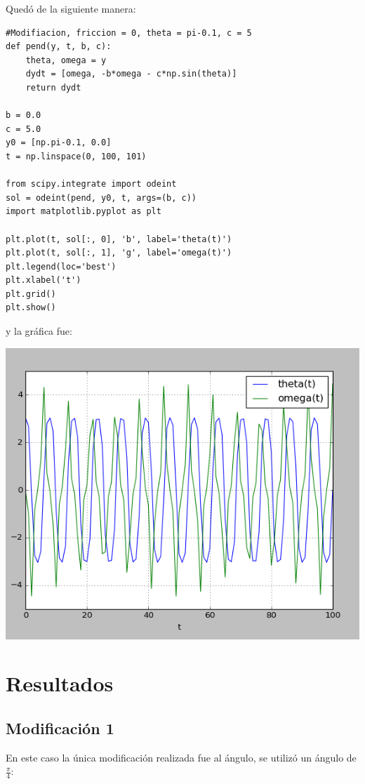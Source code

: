 \documentclass[12pt,letterpaper]{article}
\begin{document}
Quedó de la siguiente manera:

\begin{verbatim}
#Modifiacion, friccion = 0, theta = pi-0.1, c = 5
def pend(y, t, b, c):
    theta, omega = y
    dydt = [omega, -b*omega - c*np.sin(theta)]
    return dydt
    
b = 0.0
c = 5.0
y0 = [np.pi-0.1, 0.0]
t = np.linspace(0, 100, 101)
    
from scipy.integrate import odeint
sol = odeint(pend, y0, t, args=(b, c))
import matplotlib.pyplot as plt
   
plt.plot(t, sol[:, 0], 'b', label='theta(t)')
plt.plot(t, sol[:, 1], 'g', label='omega(t)')
plt.legend(loc='best')
plt.xlabel('t')
plt.grid()
plt.show()

\end{verbatim}
y la gráfica fue: 

\begin{center}
\includegraphics[scale=0.6]{act5codigo1.png}

\end{center}

\section{Resultados}
\subsection*{Modificación 1}

En este caso la única modificación realizada fue al ángulo, se utilizó un ángulo de $\frac{\pi}{4}$: 
\end{document}
